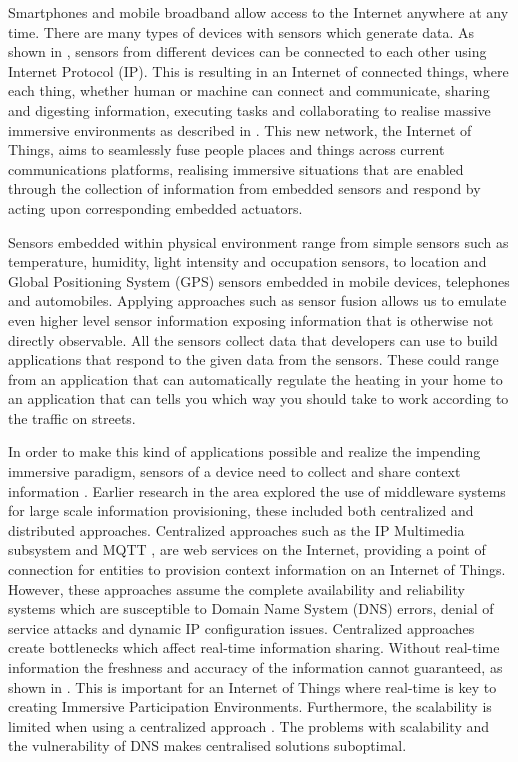 Smartphones and mobile broadband allow access to the Internet anywhere at any time. There are many types of devices with sensors which generate data. As shown in \cite{chui2010internet}, sensors from different devices can be connected to each other using Internet Protocol (IP). This is resulting in an Internet of connected things, where each thing, whether human or machine can connect and communicate, sharing and digesting information, executing tasks and collaborating to realise massive immersive environments as described in \cite{tan2010future}. This new network, the Internet of Things, aims to seamlessly fuse people places and things across current communications platforms, realising immersive situations that are enabled through the collection of information from embedded sensors and respond by acting upon corresponding embedded actuators. 

Sensors embedded within physical environment range from simple sensors such as temperature, humidity, light intensity and occupation sensors, to location and Global Positioning System (GPS) sensors embedded in mobile devices, telephones and automobiles. Applying approaches such as sensor fusion allows us to emulate even higher level sensor information exposing information that is otherwise not directly observable. All the sensors collect data that developers can use to build applications that respond to the given data from the sensors. These could range from an application that can automatically regulate the heating in your home to an application that can tells you which way you should take to work according to the traffic on streets.

In order to make this kind of applications possible and realize the impending immersive paradigm, sensors of a device need to collect and share context information \cite{dey2001understanding}. Earlier research in the area explored the use of middleware systems for large scale information provisioning, these included both centralized and distributed approaches. Centralized approaches such as the IP Multimedia subsystem \cite{Kardeby:2010:UMF:1845879.1846331} and MQTT \cite{HunkelerTS08}, are web services on the Internet, providing a point of connection for entities to provision context information on an Internet of Things. However, these approaches assume the complete availability and reliability systems which are susceptible to Domain Name System (DNS) errors, denial of service attacks and dynamic IP configuration issues. Centralized approaches create bottlenecks which affect real-time information sharing. Without real-time information the freshness and accuracy of the information cannot guaranteed, as shown in \cite{Walters437970}. This is important for an Internet of Things where real-time is key to creating Immersive Participation Environments. Furthermore, the scalability is limited when using a centralized approach \cite{Kanter539187}. The problems with scalability and the vulnerability of DNS makes centralised solutions suboptimal. 

